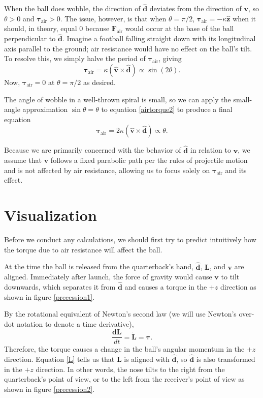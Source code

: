 \documentclass{article}
\begin{document}
When the ball does wobble, the direction of $\mathbf{\hat{d}}$ deviates from the direction of $\mathbf{v}$, so $\theta > 0$ and $\pmb{\tau}_{\text{air}} > 0$. The issue, however, is that when $\theta = \pi/2$, $\pmb{\tau}_{\text{air}} = -\kappa\mathbf{\hat{z}}$ when it should, in theory, equal $0$ because $\mathbf{F}_{\text{air}}$ would occur at the base of the ball perpendicular to $\mathbf{\hat{d}}$. Imagine a football falling straight down with its longitudinal axis parallel to the ground; air resistance would have no effect on the ball's tilt. To resolve this, we simply halve the period of $\pmb{\tau}_{\text{air}}$, giving
\begin{equation}\label{airtorque2}
    \pmb{\tau}_{\text{air}} = \kappa(\mathbf{\hat{v}} \times \mathbf{\hat{d}}) \propto \sin{(2\theta)}\text{.}
\end{equation}
Now, $\pmb{\tau}_{\text{air}} = 0$ at $\theta = \pi/2$ as desired.

The angle of wobble in a well-thrown spiral is small, so we can apply the small-angle approximation $\sin{\theta}=\theta$ to equation \ref{airtorque2} to produce a final equation
\begin{equation}\label{airtorque3}
    \pmb{\tau}_{\text{air}} = 2\kappa(\mathbf{\hat{v}} \times \mathbf{\hat{d}}) \propto \theta \text{.}
\end{equation}

Because we are primarily concerned with the behavior of $\mathbf{\hat{d}}$ in relation to $\mathbf{v}$, we assume that $\mathbf{v}$ follows a fixed parabolic path per the rules of projectile motion and is not affected by air resistance, allowing us to focus solely on $\pmb{\tau}_{\text{air}}$ and its effect.

\section{Visualization}
Before we conduct any calculations, we should first try to predict intuitively how the torque due to air resistance will affect the ball.

At the time the ball is released from the quarterback's hand, $\mathbf{\hat{d}}$, $\mathbf{L}$, and $\mathbf{v}$ are aligned. Immediately after launch, the force of gravity would cause $\mathbf{v}$ to tilt downwards, which separates it from $\mathbf{\hat{d}}$ and causes a torque in the $+z$ direction as shown in figure \ref{precession1}.

By the rotational equivalent of Newton's second law (we will use Newton's over-dot notation to denote a time derivative),
\begin{equation}\label{secondlaw}
    \frac{\mathbf{dL}}{dt} = \mathbf{\dot{L}} = \pmb{\tau}\text{.}
\end{equation}
Therefore, the torque causes a change in the ball's angular momentum in the $+z$ direction. Equation \ref{L} tells us that $\mathbf{L}$ is aligned with $\mathbf{\hat{d}}$, so $\mathbf{\hat{d}}$ is also transformed in the $+z$ direction. In other words, the nose tilts to the right from the quarterback's point of view, or to the left from the receiver's point of view as shown in figure \ref{precession2}.
\end{document}
